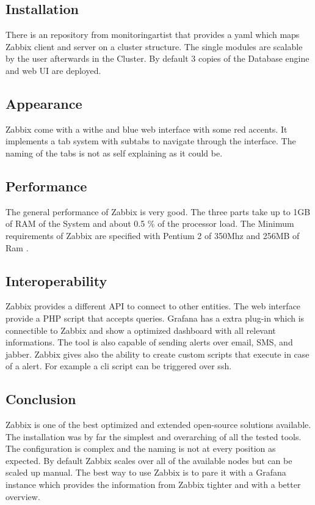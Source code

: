 \subsection{Installation}
There is an repository from monitoringartist \cite{zabbix_kube} that provides a yaml which maps Zabbix client and server on a cluster structure. The single modules are scalable by the user afterwards in the Cluster. By default 3 copies of the Database engine and web UI are deployed.
\subsection{Appearance}%
Zabbix come with a withe and blue web interface with some red accents. It implements a tab system with subtabs to navigate through the interface. The naming of the tabs is not as self explaining as it could be.  
\subsection{Performance}
The general performance of Zabbix is very good. The three parts take up to 1GB of RAM of the System and about 0.5 \% of the processor load. The Minimum requirements of Zabbix are specified with Pentium 2 of 350Mhz and 256MB of Ram \cite{Marik2014}.
\subsection{Interoperability}
Zabbix provides a different API to connect to other entities. The web interface  provide a PHP script that accepts queries. Grafana has a extra plug-in which is connectible to Zabbix and show a optimized dashboard with all relevant informations. The tool is also capable of sending alerts over email, SMS, and jabber. Zabbix gives also the ability to create custom scripts that execute in case of a alert. For example a cli script can be triggered over ssh. 
\subsection{Conclusion}
Zabbix is one of the best optimized and extended open-source solutions available. The installation was by far the simplest and overarching of all the tested tools. The configuration is complex and the naming is not at every position as expected. By default Zabbix scales over all of the available nodes but can be scaled up manual. The best way to use Zabbix is to pare it with a Grafana instance which provides the information from Zabbix tighter and with a better overview.

